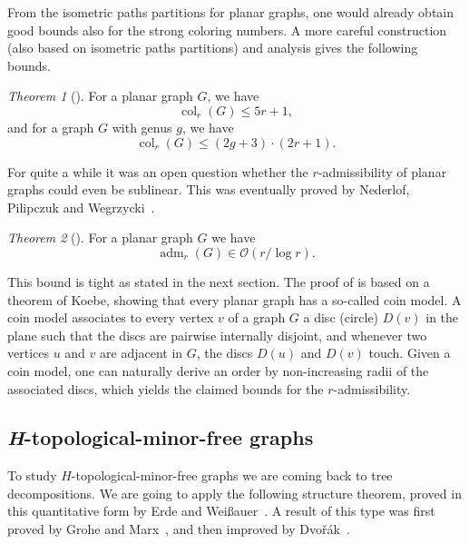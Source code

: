 \documentclass[1p,number,a4paper]{elsarticle}
\theoremstyle{remark}
\newcommand{\Oof}{\mathcal{O}}
\DeclareMathOperator{\col}{col}
\DeclareMathOperator{\adm}{adm}
\newtheorem{theorem}{Theorem}[section]
\begin{document}
From the isometric paths partitions for planar graphs, one would already obtain good bounds also for the strong coloring numbers. A more careful construction (also based on isometric paths partitions) and analysis gives the following bounds. 

\begin{theorem}[\cite{van2017generalised}]
  For a planar graph $G$, we have 
  \begin{equation*}
    \col_r(G)\le 5r+1,
   \end{equation*}
   and for a graph $G$ with genus $g$, we have
   \begin{equation*}
    \col_r(G)\le (2g+3)\cdot(2r+1).
   \end{equation*}
\end{theorem}


For quite a while it was an open question whether the $r$-admissibility of planar graphs could even be sublinear. This was eventually proved by 
Nederlof, Pilipczuk and Wegrzycki~\cite{NederlofPW23}.  

\begin{theorem}[\cite{NederlofPW23}]\label{thm:adm-planar}
  For a planar graph $G$ we have 
  \[\adm_r(G)\in \Oof(r/\log r).\]
\end{theorem}

This bound is tight as stated in the next section. 
The proof of  is based on a theorem of Koebe, showing that every planar graph has a so-called coin model. A coin model associates to every vertex $v$ of a graph $G$ a disc (circle) $D(v)$ in the plane such that the discs are pairwise internally disjoint, and whenever two vertices $u$ and $v$ are adjacent in $G$, the discs $D(u)$ and $D(v)$ touch. 
Given a coin model, one can naturally derive an order by non-increasing radii of the associated discs, which yields the claimed bounds for the $r$-admissibility. 

\subsection{\textit{H}-topological-minor-free graphs}

To study $H$-topological-minor-free graphs we are coming back to tree decompositions. 
We are going to apply the following structure theorem, 
proved in this quantitative form by Erde and Wei\ss auer~\cite{erde2018short}. A result of this type was first 
proved 
by Grohe and Marx~\cite{grohe2015structure}, and then improved by Dvo\v{r}\'ak~\cite{dvorak2012stronger}. 
\end{document}
